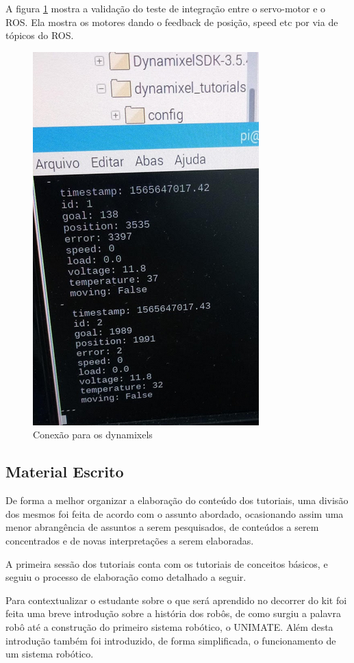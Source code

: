 A figura \ref{fig:term_dyna} mostra a validação do teste de integração entre o servo-motor e o ROS. Ela mostra os motores dando o feedback de posição, speed etc por via de tópicos do ROS.

\begin{figure}[H]
	\centering
	\includegraphics[scale=0.8, angle=0]{Figures/terminal_dyna.png}
	\caption{Conexão para os dynamixels}
	\label{fig:term_dyna}
\end{figure}


\subsection{Material Escrito}
De forma a melhor organizar a elaboração do conteúdo dos tutoriais, uma divisão dos mesmos foi feita de acordo com o assunto abordado, ocasionando assim uma menor abrangência de assuntos a serem pesquisados, de conteúdos a serem concentrados e de novas interpretações a serem elaboradas.

A primeira sessão dos tutoriais conta com os tutoriais de conceitos básicos, e seguiu o processo de elaboração como detalhado a seguir.

Para contextualizar o estudante sobre o que será aprendido no decorrer do kit foi feita uma breve introdução sobre a história dos robôs, de como surgiu a palavra robô até a construção do primeiro sistema robótico, o UNIMATE. Além desta introdução também foi introduzido, de forma simplificada, o funcionamento de um sistema robótico.


